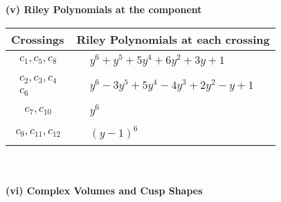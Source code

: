 \documentclass[1p]{elsarticle_modified}
\theoremstyle{definition}
\begin{document}
\newpage\renewcommand{\arraystretch}{1}
\flushleft \textbf{(v) Riley Polynomials at the component}\newline \\
\begin{tabular}{m{50pt}|m{274pt}}
Crossings & \hspace{64pt}Riley Polynomials at each crossing \\
\hline $$\begin{aligned}c_{1},c_{5},c_{8}\end{aligned}$$&$\begin{aligned}
&y^6+y^5+5 y^4+6 y^2+3 y+1
\end{aligned}$\\
\hline $$\begin{aligned}c_{2},c_{3},c_{4}\\c_{6}\end{aligned}$$&$\begin{aligned}
&y^6-3 y^5+5 y^4-4 y^3+2 y^2- y+1
\end{aligned}$\\
\hline $$\begin{aligned}c_{7},c_{10}\end{aligned}$$&$\begin{aligned}
&y^6
\end{aligned}$\\
\hline $$\begin{aligned}c_{9},c_{11},c_{12}\end{aligned}$$&$\begin{aligned}
&(y-1)^6
\end{aligned}$\\
\hline
\end{tabular}\\~\\
\newpage\flushleft \textbf{(vi) Complex Volumes and Cusp Shapes}
\end{document}

